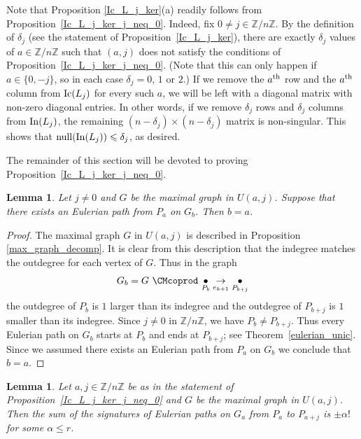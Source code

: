 \documentclass{amsproc}
\newtheorem{lemma}[theorem]{Lemma}
\theoremstyle{definition}
\theoremstyle{remark}
\numberwithin{equation}{section}
\newcommand{\Z}{{\mathbb Z}}
\newcommand{\In}{{\rm In}}
\newcommand{\Ic}{{\rm Ic}}
\newcommand{\nullity}{{\rm null}}
\begin{document}
Note that Proposition \ref{Ic_L_j_ker}(a) readily follows from Proposition~\ref{Ic_L_j_ker_j_neq_0}.
Indeed, fix $0 \neq j \in \Z/ n \Z$. By the definition of $\delta_j$ (see the statement of Proposition~\ref{Ic_L_j_ker}), 
there are exactly $\delta_j$ values of $a \in \Z/ n \Z$ such that $(a, j)$ does not satisfy the conditions of Proposition~\ref{Ic_L_j_ker_j_neq_0}.
(Note that this can only happen if $a \in \{ 0, -j \}$, so in each case $\delta_j = 0$, $1$ or $2$.) If we remove the $a^{\rm th}$ 
row and the $a^{\rm th}$ column from $\Ic(L_j)$ for every such $a$, we will be left with a diagonal matrix with non-zero 
diagonal entries. In other words, if we remove $\delta_j$ rows and $\delta_j$ columns from $\In(L_j)$, the remaining
$(n- \delta_j) \times (n - \delta_j)$ matrix is non-singular. This shows that $\nullity(\In(L_j)) \leqslant \delta_j$, as desired.

\smallskip
The remainder of this section will be devoted to proving Proposition~\ref{Ic_L_j_ker_j_neq_0}.


\begin{lemma}\label{only_diagonal}
Let $j\neq 0$ and $G$ be the maximal graph in $U(a,j)$. Suppose that there exists an Eulerian path from $P_a$ on $G_b$. Then $b=a$.
\end{lemma}

\begin{proof} The maximal graph $G$ in $U(a, j)$ is described in Proposition \ref{max_graph_decomp}. 
It is clear from this description that the indegree matches the outdegree for each vertex of $G$. Thus in the graph
\[G_b=G\ \CMcoprod\ \underset{P_b}\bullet \underset{e_{k+1}}\rightarrow \underset{P_{b+j}}\bullet\]
the outdegree of $P_b$ is $1$ larger than its indegree and the outdegree of $P_{b+j}$ is $1$ smaller than its indegree. 
Since $j \neq 0$ in $\mathbb Z/ n \mathbb Z$, we have $P_b\neq P_{b+j}$. Thus every Eulerian path on $G_b$ starts at $P_b$ and ends at $P_{b+j}$;
see Theorem~\ref{eulerian_unic}.
Since we assumed there exists an Eulerian path from $P_a$ on $G_b$ we conclude that $b=a$.
\end{proof}

\begin{lemma}\label{nonzero_diagonal} Let $a, j \in \mathbb Z / n \mathbb Z$ be as in the statement of Proposition~\ref{Ic_L_j_ker_j_neq_0}
and $G$ be the maximal graph in $U(a, j)$. Then the sum of the signatures of Eulerian paths on $G_a$ from $P_a$ to $P_{a+j}$ 
is $\pm\alpha!$ for some $\alpha\leqslant r$.
\end{lemma}
\end{document}

